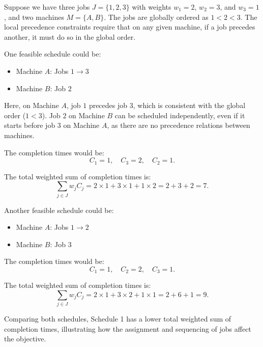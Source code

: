 Suppose we have three jobs $J = \{1, 2, 3\}$ with weights $w_1 = 2$, $w_2 = 3$, and $w_3 = 1$, and two machines $M = \{A, B\}$. The jobs are globally ordered as $1 < 2 < 3$. The local precedence constraints require that on any given machine, if a job precedes another, it must do so in the global order.

One feasible schedule could be:

\begin{example}[Schedule 1]
    \hfill
    \begin{itemize}
        \item Machine $A$: Jobs $1 \rightarrow 3$
        \item Machine $B$: Job $2$
    \end{itemize}

    Here, on Machine $A$, job $1$ precedes job $3$, which is consistent with the global order ($1 < 3$). Job $2$ on Machine $B$ can be scheduled independently, even if it starts before job $3$ on Machine $A$, as there are no precedence relations between machines.

    The completion times would be:
    \[
        C_1 = 1, \quad C_3 = 2, \quad C_2 = 1.
    \]

    The total weighted sum of completion times is:
    \[
        \sum_{j \in J} w_j C_j = 2 \times 1 + 3 \times 1 + 1 \times 2 = 2 + 3 + 2 = 7.
    \]
\end{example}

Another feasible schedule could be:

\begin{example}[Schedule 2]
    \hfill
    \begin{itemize}
        \item Machine $A$: Jobs $1 \rightarrow 2$
        \item Machine $B$: Job $3$
    \end{itemize}

    The completion times would be:
    \[
        C_1 = 1, \quad C_2 = 2, \quad C_3 = 1.
    \]

    The total weighted sum of completion times is:
    \[
        \sum_{j \in J} w_j C_j = 2 \times 1 + 3 \times 2 + 1 \times 1 = 2 + 6 + 1 = 9.
    \]
\end{example}

Comparing both schedules, Schedule 1 has a lower total weighted sum of completion times, illustrating how the assignment and sequencing of jobs affect the objective.


